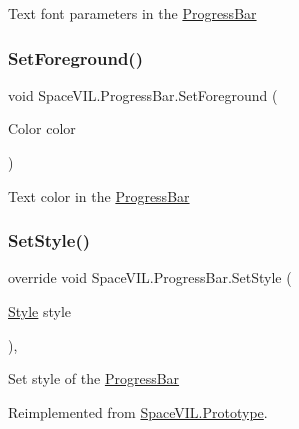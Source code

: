 Text font parameters in the \mbox{\hyperlink{class_space_v_i_l_1_1_progress_bar}{Progress\+Bar}} 

\mbox{\label{class_space_v_i_l_1_1_progress_bar_a0f02716ed6e2bd89e2dcf9ca6c575b84}} 
\subsubsection{\texorpdfstring{Set\+Foreground()}{SetForeground()}}
{\footnotesize\ttfamily void Space\+V\+I\+L.\+Progress\+Bar.\+Set\+Foreground (\begin{DoxyParamCaption}\item[{Color}]{color }\end{DoxyParamCaption})\hspace{0.3cm}{\ttfamily [inline]}}



Text color in the \mbox{\hyperlink{class_space_v_i_l_1_1_progress_bar}{Progress\+Bar}} 

\mbox{\label{class_space_v_i_l_1_1_progress_bar_a7dc05324af7a604cef781aab687b17cc}} 
\subsubsection{\texorpdfstring{Set\+Style()}{SetStyle()}}
{\footnotesize\ttfamily override void Space\+V\+I\+L.\+Progress\+Bar.\+Set\+Style (\begin{DoxyParamCaption}\item[{\mbox{\hyperlink{class_space_v_i_l_1_1_decorations_1_1_style}{Style}}}]{style }\end{DoxyParamCaption})\hspace{0.3cm}{\ttfamily [inline]}, {\ttfamily [virtual]}}



Set style of the \mbox{\hyperlink{class_space_v_i_l_1_1_progress_bar}{Progress\+Bar}} 



Reimplemented from \mbox{\hyperlink{class_space_v_i_l_1_1_prototype_ae96644a6ace490afb376fb542161e541}{Space\+V\+I\+L.\+Prototype}}.

